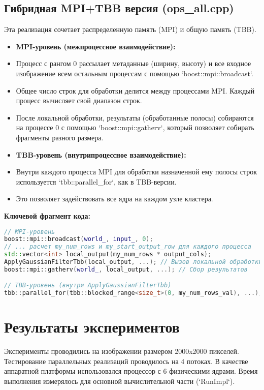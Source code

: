 \documentclass[12pt,a4paper]{extarticle}
\begin{document}
\subsection{Гибридная MPI+TBB версия (ops\_all.cpp)}
Эта реализация сочетает распределенную память (MPI) и общую память (TBB).
\begin{itemize}
    \item \textbf{MPI-уровень (межпроцессное взаимодействие):}
        \item Процесс с рангом 0 рассылает метаданные (ширину, высоту) и все входное изображение всем остальным процессам с помощью `boost::mpi::broadcast`.
        \item Общее число строк для обработки делится между процессами MPI. Каждый процесс вычисляет свой диапазон строк.
        \item После локальной обработки, результаты (обработанные полосы) собираются на процессе 0 с помощью `boost::mpi::gatherv`, который позволяет собирать фрагменты разного размера.
    \item \textbf{TBB-уровень (внутрипроцессное взаимодействие):}
        \item Внутри каждого процесса MPI для обработки назначенной ему полосы строк используется `tbb::parallel_for`, как в TBB-версии.
        \item Это позволяет задействовать все ядра на каждом узле кластера.
\end{itemize}
\textbf{Ключевой фрагмент кода:}
\begin{lstlisting}[language=C++]
// MPI-уровень
boost::mpi::broadcast(world_, input_, 0);
// ... расчет my_num_rows и my_start_output_row для каждого процесса
std::vector<int> local_output(my_num_rows * output_cols);
ApplyGaussianFilterTbb(local_output, ...); // Вызов локальной обработки
boost::mpi::gatherv(world_, local_output, ...); // Сбор результатов

// TBB-уровень (внутри ApplyGaussianFilterTbb)
tbb::parallel_for(tbb::blocked_range<size_t>(0, my_num_rows_val), ...);
\end{lstlisting}

\newpage
\section{Результаты экспериментов}
Эксперименты проводились на изображении размером 2000x2000 пикселей. Тестирование параллельных реализаций проводилось на 4 потоках. В качестве аппаратной платформы использовался процессор с 6 физическими ядрами. Время выполнения измерялось для основной вычислительной части (`RunImpl`).
\end{document}
